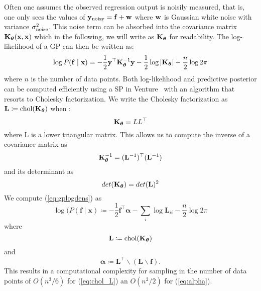 Often one assumes the observed regression output is noisily measured, that is,
one only sees the values of $\mathbf{y}_{\textrm{noisy}} = \mathbf{f}+ \mathbf{w}$ where $\mathbf{w}$ is
Gaussian white noise with variance $\sigma_{\textrm{noise}}^2$. This noise term can be
absorbed into the covariance matrix $\mathbf{K}_{\bm{\theta}}(\mathbf{x},\mathbf{x})$ which in the
following, we will write as $\mathbf{K}_{\bm{\theta}}$ for readability. The log-likelihood of a \ac{GP} can then be written as:
\begin{equation}
\label{eq:gplogdens}
\log P(\mathbf{f} \mid \mathbf{x}) =
-\frac12 \mathbf{y}^\top 
\mathbf{K}_{\bm{\theta}}^{-1} \mathbf{y}
- \frac12\log \left\lvert \mathbf{K}_{\bm{\theta}} \right\rvert
- \frac{n}{2}\log 2\pi
\end{equation}
where $n$ is the number of data points.
Both log-likelihood and predictive posterior can be computed efficiently using a \ac{SP} in Venture~\citep{mansinghka2014venture}
with an algorithm that resorts to Cholesky factorization\citep[chap. 2]{rasmussen2006gaussian}. 
We write the Cholesky factorization as 
$\mathbf{L} \coloneqq \text{chol}(\mathbf{K}_{\bm{\theta}})$ when
:
\begin{equation}
\mathbf{K}_{\bm{\theta}} = LL^\top
\end{equation}
where L is a lower triangular matrix. This allows us to compute the inverse of a covariance matrix as
\begin{equation}
\mathbf{K}_{\bm{\theta}}^{-1} = (\mathbf{L}^{-1})^\top (\mathbf{L}^{-1})
\end{equation}
and its determinant as 
\begin{equation}
det(\mathbf{K}_{\bm{\theta}}) = det(\mathbf{L})^2
\end{equation}
We compute (\ref{eq:gplogdens}) as
\begin{equation}
\log(P(\mathbf{f}\mid \mathbf{x})\coloneqq - \frac{1}{2} \mathbf{f}^\top \bm{\alpha} - \sum_i \log \mathbf{L}_{ii} - \frac{n}{2} \log 2 \pi
\end{equation}
where 
\begin{equation}
\label{eq:chol_L}
\mathbf{L} \coloneqq \text{chol}(\mathbf{K}_{\bm{\theta}})
\end{equation}
and 
\begin{equation}
\label{eq:alpha}
\bm{\alpha} \coloneqq  \mathbf{L}^\top \backslash(\mathbf{L} \backslash \mathbf{f}). 
\end{equation}
This results in a computational complexity for sampling in the number of data points of $O(n^3/6)$ for (\ref{eq:chol_L}) an $O(n^2/2)$ for (\ref{eq:alpha}). 

